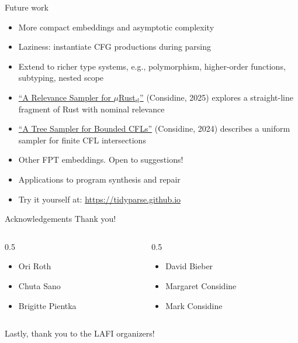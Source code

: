 \documentclass{beamer}
\begin{document}
\begin{frame}{Future work}
  \begin{itemize}
    \item More compact embeddings and asymptotic complexity
    \item Laziness: instantiate CFG productions during parsing
    \item Extend to richer type systems, e.g., polymorphism, higher-order functions, subtyping, nested scope
    \item \href{https://arxiv.org/pdf/2512.01036v1}{``A Relevance Sampler for $\mu$Rust$_{\text{sl}}$''} (Considine, 2025) explores a straight-line fragment of Rust with nominal relevance
    \item \href{https://arxiv.org/pdf/2408.01849}{``A Tree Sampler for Bounded CFLs''} (Considine, 2024) describes a uniform sampler for finite CFL intersections
    \item Other FPT embeddings. Open to suggestions!
    \item Applications to program synthesis and repair
    \item Try it yourself at: \href{https://tidyparse.github.io}{https://tidyparse.github.io}
  \end{itemize}
\end{frame}

\begin{frame}{Acknowledgements}
  \centering\Large{Thank you!}\vspace{0.5cm}
  \begin{columns}
  \begin{column}{0.5\textwidth}
  \begin{itemize}
    \item Ori Roth
    \item Chuta Sano
    \item Brigitte Pientka
  \end{itemize}
  \end{column}
  \begin{column}{0.5\textwidth}
    \begin{itemize}
      \item David Bieber
      \item Margaret Considine
      \item Mark Considine
    \end{itemize}
  \end{column}
  \end{columns}\vspace{1cm}
  Lastly, thank you to the LAFI organizers!
\end{frame}
\end{document}
